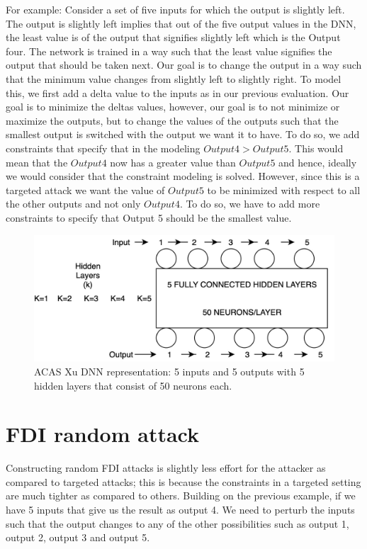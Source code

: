 For example: Consider a set of five inputs for which the output is slightly left. The output is slightly left implies that out of the five output values in the DNN, the least value is of the output that signifies slightly left which is the Output four. The network is trained in a way such that the least value signifies the output that should be taken next. Our goal is to change the output in a way such that the minimum value changes from slightly left to slightly right. To model this, we first add a delta value to the inputs as in our previous evaluation. Our goal is to minimize the deltas values, however, our goal is to not minimize or maximize the outputs, but to change the values of the outputs such that the smallest output is switched with the output we want it to have. To do so, we add constraints that specify that in the modeling $Output 4 > Output 5$. This would mean that the $Output 4$ now has a greater value than $Output 5$ and hence, ideally we would consider that the constraint modeling is solved. However, since this is a targeted attack we want the value of $Output 5$ to be minimized with respect to all the other outputs and not only $Output 4$. To do so, we have to add more constraints to specify that Output 5 should be the smallest value.

\begin{figure}
	\centering
	\includegraphics[width=0.7\linewidth]{Images/ACASXuDNN}
	\caption[ACAS Xu DNN]{ACAS Xu DNN representation: 5 inputs and 5 outputs with 5 hidden layers that consist of 50 neurons each.}
	\label{fig:acasxudnn}
\end{figure}

\section{FDI random attack} 
Constructing random FDI attacks is slightly less effort for the attacker as compared to targeted attacks; this is because the constraints in a targeted setting are much tighter as compared to others. 
Building on the previous example, if we have 5 inputs that give us the result as output 4. We need to perturb the inputs such that the output changes to any of the other possibilities such as output 1, output 2, output 3 and output 5.

